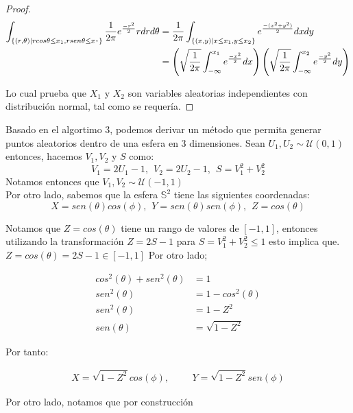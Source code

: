 \begin{proof}
\begin{align*}
    \int_{\{(r,\theta) | rcos\theta \leq x_1 , r sen\theta \leq x_"\}} \frac{1}{2\pi}e^{\frac{-r^2}{2}} r dr d\theta &= \frac{1}{2\pi} \int_{\{(x,y) | x \leq x_1, y \leq x_2\}}e^{\frac{-(x^2 + y^2)}{2}} dx dy \\
    &= \left(  \sqrt{\frac{1}{2\pi}} \int_{-\infty}^{x_1} e^{\frac{-x^2}{2}}dx\right)\left(  \sqrt{\frac{1}{2\pi}} \int_{-\infty}^{x_2} e^{\frac{-y^2}{2}}dy\right)
\end{align*}

Lo cual prueba que $X_1$ y $X_2$ son variables aleatorias independientes con distribución normal, tal como se requería.
    
\end{proof}
Basado en el algortimo 3, podemos derivar un método que permita generar puntos aleatorios dentro de una esfera en 3 dimensiones.
Sean $U_1,U_2 \sim \mathcal{U}(0,1)$ entonces, hacemos $V_1,V_2$ y $S$ como:
\[
    V_1 = 2U_1-1, \hspace{5pt} V_2=2U_2-1, \hspace{5pt} S = V_1^2+V_2^2
\]
Notamos entonces que $V_1,V_2 \sim \mathcal{U}(-1,1)$
\\Por otro lado, sabemos que la esfera $\mathbb{S}^2$ tiene las siguientes coordenadas:
\[
X = sen(\theta)cos(\phi),  \hspace{5pt} Y = sen(\theta)sen(\phi),  \hspace{5pt} Z = cos(\theta) 
\]

Notamos que $Z = cos(\theta)$ tiene un rango de valores de $[-1,1]$, entonces utilizando la transformación $Z = 2S-1$ para $S = V_1^2 + V_2^2 \leq 1$ esto implica que. $Z=cos(\theta) = 2S-1 \in [-1,1]$
Por otro lado;

\begin{align*}
    cos^2(\theta) + sen^2(\theta) &= 1\\
    sen^2(\theta)&=1-cos^2(\theta)\\
    sen^2(\theta)&=1-Z^2\\
    sen(\theta)&=\sqrt{1-Z^2}
\end{align*}

Por tanto:

\begin{align*} \tag{1} \label{XY}
  X = \sqrt{1-Z^2} cos(\phi), \hspace{1cm} Y=\sqrt{1-Z^2}sen(\phi)  
\end{align*}


Por otro lado, notamos que por construcción

